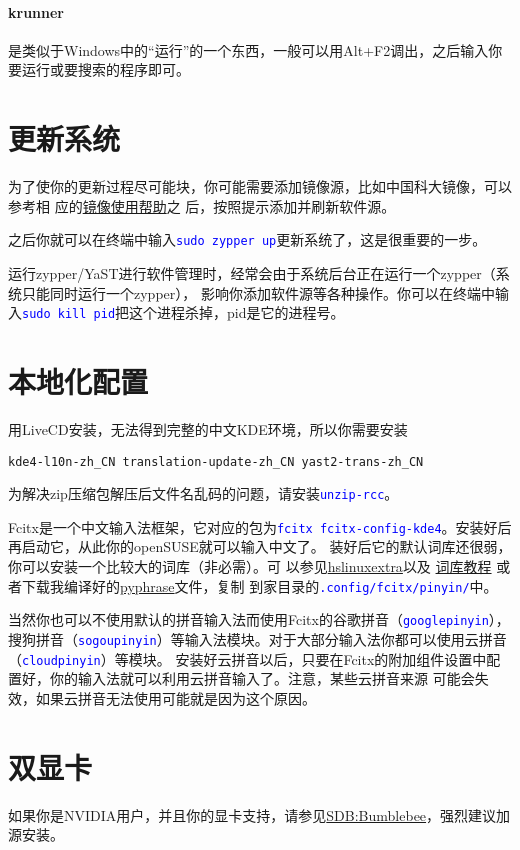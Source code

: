 \documentclass[10pt,openany]{book}
\newcommand{\command}[1]{\texttt{\textcolor{blue}{#1}}}
\newcommand{\soft}[1]{\texttt{\textcolor{blue}{#1}}}
\begin{document}
\paragraph{krunner} 是类似于Windows中的“运行”的一个东西，一般可以用Alt+F2调出，之后输入你要运行或要搜索的程序即可。

\section{更新系统}
为了使你的更新过程尽可能块，你可能需要添加镜像源，比如中国科大镜像，可以参考相
应的\href{https://lug.ustc.edu.cn/wiki/mirrors/help/opensuse}{镜像使用帮助}之
后，按照提示添加并刷新软件源。

之后你就可以在终端中输入\command{sudo zypper up}更新系统了，这是很重要的一步。

运行zypper/YaST进行软件管理时，经常会由于系统后台正在运行一个zypper（系统只能同时运行一个zypper），
影响你添加软件源等各种操作。你可以在终端中输入\command{sudo kill pid}把这个进程杀掉，pid是它的进程号。

\section{本地化配置}
用LiveCD安装，无法得到完整的中文KDE环境，所以你需要安装
\begin{Verbatim}[formatcom=\color{codecolor}]
    kde4-l10n-zh_CN translation-update-zh_CN yast2-trans-zh_CN
\end{Verbatim}

为解决zip压缩包解压后文件名乱码的问题，请安装\soft{unzip-rcc}。

Fcitx是一个中文输入法框架，它对应的包为\soft{fcitx fcitx-config-kde4}。安装好后再启动它，从此你的openSUSE就可以输入中文了。
装好后它的默认词库还很弱，你可以安装一个比较大的词库（非必需）。可%
以参见\href{https://code.google.com/p/hslinuxextra/}{hs\-linux\-extra}以及%
\href{https://www.librehat.com/fcitx-sogou-pinyin-cell-database-convert-import-guide/}{词库教程}%
或者下载我编译好的\href{http://pan.baidu.com/s/1i3HtJ4T}{pyphrase}文件，复制
到家目录的\command{.config/fcitx/pinyin/}中。

当然你也可以不使用默认的拼音输入法而使用Fcitx的谷歌拼音（\soft{goo\-gle\-pin\-yin}），
搜狗拼音（\soft{so\-gou\-pin\-yin}）等输入法模块。对于大部分输入法你都可以使用云拼音（\soft{cloud\-pin\-yin}）等模块。
安装好云拼音以后，只要在Fcitx的附加组件设置中配置好，你的输入法就可以利用云拼音输入了。注意，某些云拼音来源
可能会失效，如果云拼音无法使用可能就是因为这个原因。
\section[双显卡]{双显卡}
如果你是NVIDIA用户，并且你的显卡支持，请参见\href{https://zh.opensuse.org/SDB:Bumblebee}{SDB:Bumblebee}，强烈建议加源安装。
\end{document}
